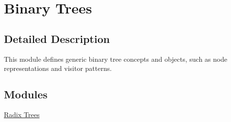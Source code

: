 \hypertarget{group__bintree}{}\section{Binary Trees}
\label{group__bintree}


\subsection{Detailed Description}
This module defines generic binary tree concepts and objects, such as node representations and visitor patterns. \subsection*{Modules}
\begin{DoxyCompactItemize}
\item 
\hyperlink{group__radixtree}{Radix Trees}
\end{DoxyCompactItemize}
